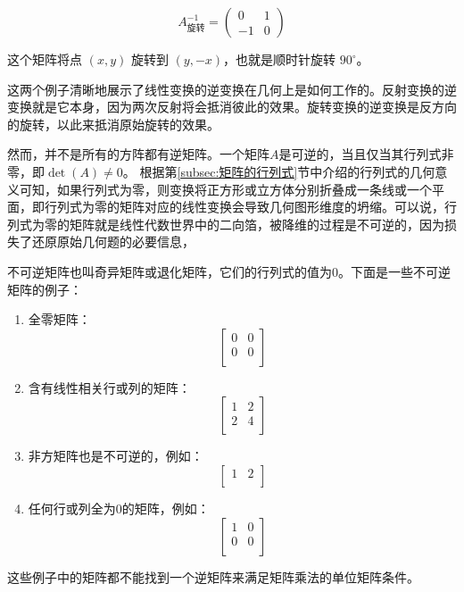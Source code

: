\[ A_{\text{旋转}}^{-1} = \begin{pmatrix} 0 & 1 \\ -1 & 0 \end{pmatrix} \]

这个矩阵将点 \( (x, y) \) 旋转到 \( (y, -x) \)，也就是顺时针旋转 \(90^\circ\)。

这两个例子清晰地展示了线性变换的逆变换在几何上是如何工作的。反射变换的逆变换就是它本身，因为两次反射将会抵消彼此的效果。旋转变换的逆变换是反方向的旋转，以此来抵消原始旋转的效果。

然而，并不是所有的方阵都有逆矩阵。一个矩阵$A$是可逆的，当且仅当其行列式非零，即$\det(A)\neq 0$。
根据第\ref{subsec:矩阵的行列式}节中介绍的行列式的几何意义可知，如果行列式为零，则变换将正方形或立方体分别折叠成一条线或一个平面，即行列式为零的矩阵对应的线性变换会导致几何图形维度的坍缩。可以说，行列式为零的矩阵就是线性代数世界中的二向箔，被降维的过程是不可逆的，因为损失了还原原始几何题的必要信息，

不可逆矩阵也叫奇异矩阵或退化矩阵，它们的行列式的值为0。下面是一些不可逆矩阵的例子：

\begin{enumerate}
\item 全零矩阵：
   \[
   \begin{bmatrix}
   0 & 0 \\
   0 & 0 \\
   \end{bmatrix}
   \]

\item 含有线性相关行或列的矩阵：
   \[
   \begin{bmatrix}
   1 & 2 \\
   2 & 4 \\
   \end{bmatrix}
   \]

\item 非方矩阵也是不可逆的，例如：
   \[
   \begin{bmatrix}
   1 & 2 \\
   \end{bmatrix}
   \]

\item 任何行或列全为0的矩阵，例如：
   \[
   \begin{bmatrix}
   1 & 0 \\
   0 & 0 \\
   \end{bmatrix}
   \]
\end{enumerate}

这些例子中的矩阵都不能找到一个逆矩阵来满足矩阵乘法的单位矩阵条件。

